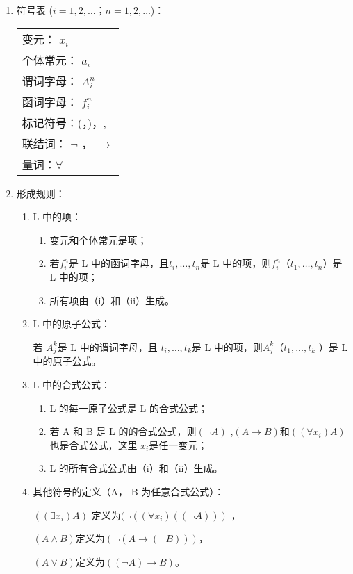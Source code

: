 \documentclass[12pt,onecolumn,a4paper]{book}
\numberwithin{table}{subsection}
\numberwithin{equation}{subsection}
\begin{document}
\begin{enumerate}
    \item 符号表 ($i = 1,2,…； n =1,2,…$)：
    
    \begin{tabular}{l}
    变元： $x_i$\\
    个体常元： $a_i$\\
    谓词字母： $A_i^n$\\
    函词字母： $f_i^n$\\
    标记符号：(，)，,\\
    联结词： $\neg$ ， $\rightarrow $\\
    量词：$\forall $\\
    \end{tabular}
    \item 形成规则：
    
    \begin{enumerate}

        \item L 中的项：
        \begin{enumerate}
            \item 变元和个体常元是项；
            \item 若$f_i^n$是 L 中的函词字母，且$ t_i,…, t_n$是 L 中的项，则$f_i^n$（$t_1, …, t_n $）是 L 中的项；
            \item 所有项由（i）和（ii）生成。
        \end{enumerate}

        \item L 中的原子公式：
        
        若  $A_j^k$是 L 中的谓词字母，且 $t_i ,…,t_k$是 L 中的项，则$A_j^k$（$t_1,…,t_k$ ）是 L 中的原子公式。

        \item L 中的合式公式：
        
        \begin{enumerate}
            \item L 的每一原子公式是 L 的合式公式；
            \item 若 A 和 B 是 L 的的合式公式，则$(\neg A)$ ,$(A→B)$和$((\forall x_i) A)$也是合式公式，这里 $x_i$是任一变元；
            \item L 的所有合式公式由（i）和（ii）生成。
        \end{enumerate}

        \item 其他符号的定义（A， B 为任意合式公式）：

        $((\exists x_i) A)$ 定义为$(¬((\forall x_i)((¬A )))$ ，

        $(A\wedge B)$定义为$(¬(A→(¬B )))$，

        $(A\vee B)$定义为$((¬A)→B )$。
    \end{enumerate}
\end{enumerate}
\end{document}
